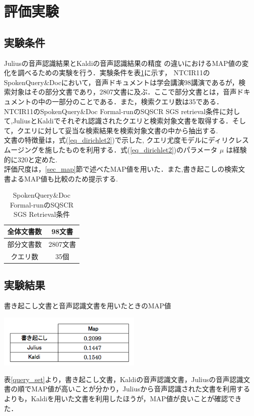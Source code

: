 \section{評価実験}
\subsection{実験条件}
Juliusの音声認識結果とKaldiの音声認識結果の精度
の違いにおけるMAP値の変化を調べるための実験を行う．実験条件を表\ref{t_condition}に示す，
NTCIR11のSpokenQuery\&Docにおいて，音声ドキュメントは学会講演98講演であるが，検索対象はその部分文書であり，2807文書に及ぶ．ここで部分文書とは，音声ドキュメントの中の一部分のことである．また，検索クエリ数は35である．
NTCIR11のSpokenQuery\&Doc Formal-runのSQSCR SGS retrieval条件に対して,JuliusとKaldiでそれぞれ認識されたクエリと検索対象文書を取得する．そして，クエリに対して妥当な検索結果を検索対象文書の中から抽出する. \\文書の特徴量は，式(\ref{eq_dirichlet2})で示した, クエリ尤度モデルにディリクレスムージングを施したものを利用する．式(\ref{eq_dirichlet2})のパラメータ $\mu$ は経験的に320と定めた. \\ 
評価尺度は，\ref{sec_map}節で述べたMAP値を用いた．また,書き起こしの検索文書よるMAP値も比較のため提示する.

\begin{table}[htbp]
    \begin{center}
        \caption{SpokenQuery\&Doc Formal-runのSQSCR SGS Retrieval条件}
        \begin{tabular}{|c|c|}
            \hline
            全体文書数 & 98文書 \\ \hline
            部分文書数 & 2807文書 \\ \hline
            クエリ数 & 35個 \\ \hline
        \end{tabular}
        \label{t_condition}
    \end{center}
\end{table}

\subsection{実験結果}

\begin{table}[htbp]
    \centering
    \caption{書き起こし文書と音声認識文書を用いたときのMAP値}
    \includegraphics[width=7cm]{./image/write_julius_kaldi.png}
    \label{query_set}
\end{table}

表\ref{query_set}より，書き起こし文書，Kaldiの音声認識文書，Juliusの音声認識文書の順でMAP値が高いことが分かり，Juliusから音声認識された文書を利用するよりも，Kaldiを用いた文書を利用したほうが，MAP値が良いことが確認できた．




